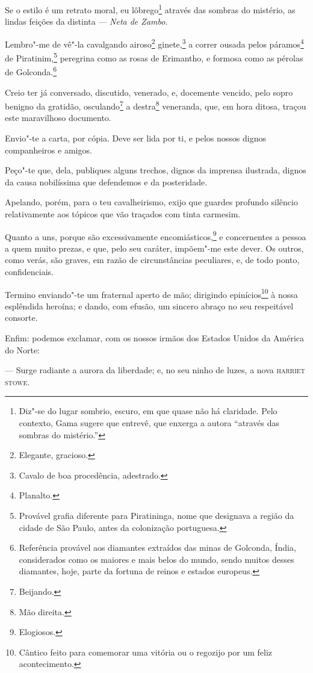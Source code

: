Se o estilo é um retrato moral, eu lôbrego\footnote{Diz"-se do lugar
  sombrio, escuro, em que quase não há claridade. Pelo contexto, Gama
  sugere que entrevê, que enxerga a autora ``através das sombras do
  mistério.''} através das sombras do mistério, as lindas feições da
distinta --- \emph{Neta de Zambo}.

Lembro"-me de vê"-la cavalgando airoso\footnote{Elegante, gracioso.}
ginete,\footnote{Cavalo de boa procedência, adestrado.} a correr
ousada pelos páramos\footnote{Planalto.} de Piratinim,\footnote{
  Provável grafia diferente para Piratininga, nome que designava a
  região da cidade de São Paulo, antes da colonização portuguesa.}
peregrina como as rosas de Erimantho, e formosa como as pérolas de
Golconda.\footnote{Referência provável aos diamantes extraídos das
  minas de Golconda, Índia, considerados como os maiores e mais belos do
  mundo, sendo muitos desses diamantes, hoje, parte da fortuna de reinos
  e estados europeus.}

Creio ter já conversado, discutido, venerado, e, docemente vencido, pelo
sopro benigno da gratidão, osculando\footnote{Beijando.} a
destra\footnote{Mão direita.} veneranda, que, em hora ditosa, traçou
este maravilhoso documento.

Envio"-te a carta, por cópia. Deve ser lida por ti, e pelos nossos dignos
companheiros e amigos.

Peço"-te que, dela, publiques alguns trechos, dignos da imprensa
ilustrada, dignos da causa nobilíssima que defendemos e da posteridade.

Apelando, porém, para o teu cavalheirismo, exijo que guardes profundo
silêncio relativamente aos tópicos que vão traçados com tinta carmesim.

Quanto a uns, porque são excessivamente encomiásticos,\footnote{
  Elogiosos.} e concernentes a pessoa a quem muito prezas, e que, pelo
seu caráter, impõem"-me este dever. Os outros, como verás, são graves, em
razão de circunstâncias peculiares, e, de todo ponto, confidenciais.

Termino enviando"-te um fraternal aperto de mão; dirigindo
epinícios\footnote{Cântico feito para comemorar uma vitória ou o
  regozijo por um feliz acontecimento.} à nossa esplêndida heroína; e
dando, com efusão, um sincero abraço no seu respeitável consorte.

Enfim: podemos exclamar, com os nossos irmãos dos Estados Unidos da
América do Norte:

--- Surge radiante a aurora da liberdade; e, no seu ninho de luzes, a
nova \textsc{harriet stowe}.

